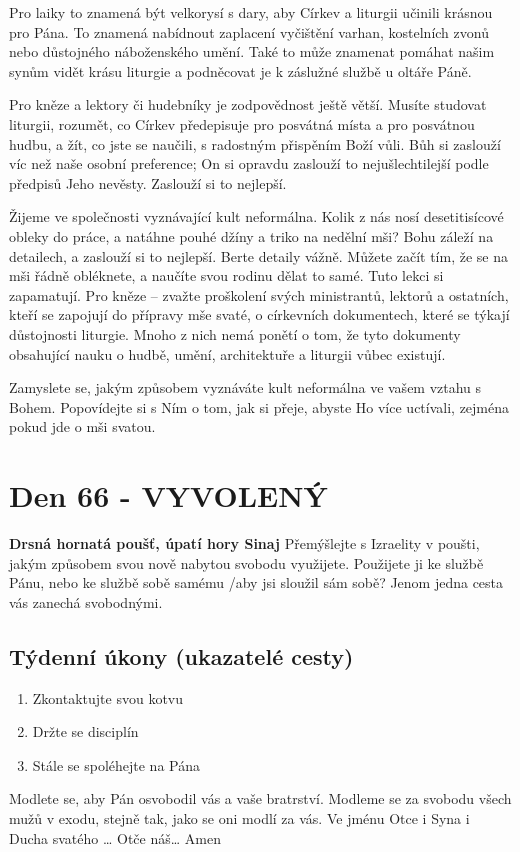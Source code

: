\documentclass[11pt]{article}
\newcommand{\zacatekDesatyTyden}{
\textbf{Drsná hornatá poušť, úpatí hory Sinaj} \newline 
Přemýšlejte s Izraelity v poušti, jakým způsobem svou nově nabytou svobodu využijete. Použijete ji ke službě Pánu, nebo ke službě sobě samému /aby jsi sloužil sám sobě? Jenom jedna cesta vás zanechá svobodnými.

\subsection*{Týdenní úkony (ukazatelé cesty)}
\begin{enumerate}
  \item Zkontaktujte svou kotvu
  \item Držte se disciplín
  \item Stále se spoléhejte na Pána
\end{enumerate}
Modlete se, aby Pán osvobodil vás a vaše bratrství. \newline
Modleme se za svobodu všech mužů v exodu, stejně tak, jako se oni modlí za vás.\newline
Ve jménu Otce i Syna i Ducha svatého …  Otče náš… Amen
}
\begin{document}
Pro laiky to znamená být velkorysí s dary, aby Církev a liturgii učinili krásnou pro Pána. To znamená nabídnout
zaplacení vyčištění varhan, kostelních zvonů nebo důstojného náboženského umění. Také to může znamenat pomáhat
našim synům vidět krásu liturgie a podněcovat je k záslužné službě u oltáře Páně.

Pro kněze a lektory či hudebníky je zodpovědnost ještě větší. Musíte studovat liturgii, rozumět, co Církev předepisuje
pro posvátná místa a pro posvátnou hudbu, a žít, co jste se naučili, s radostným přispěním Boží vůli. Bůh si zaslouží
víc než naše osobní preference; On si opravdu zaslouží to nejušlechtilejší podle předpisů Jeho nevěsty. Zaslouží si to
nejlepší.

Žijeme ve společnosti vyznávající kult neformálna. Kolik z nás nosí desetitisícové obleky do práce, a natáhne pouhé
džíny a triko na nedělní mši? Bohu záleží na detailech, a zaslouží si to nejlepší. Berte detaily vážně. Můžete začít tím,
že se na mši řádně obléknete, a naučíte svou rodinu dělat to samé. Tuto lekci si zapamatují. Pro kněze – zvažte
proškolení svých ministrantů, lektorů a ostatních, kteří se zapojují do přípravy mše svaté, o církevních dokumentech,
které se týkají důstojnosti liturgie. Mnoho z nich nemá ponětí o tom, že tyto dokumenty obsahující nauku o hudbě,
umění, architektuře a liturgii vůbec existují.

Zamyslete se, jakým způsobem vyznáváte kult neformálna ve vašem vztahu s Bohem. Popovídejte si s Ním o tom, jak
si přeje, abyste Ho více uctívali, zejména pokud jde o mši svatou.




\newpage
\section{Den 66 - VYVOLENÝ}
\zacatekDesatyTyden
\end{document}
